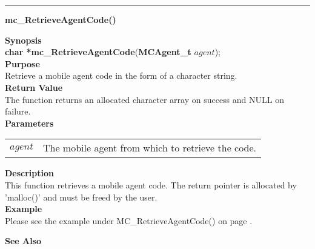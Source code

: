 \noindent
\vspace{5pt}
\rule{6.5in}{0.015in}
\noindent
{\LARGE \bf mc\_RetrieveAgentCode()}\\
{}

\noindent
{\bf Synopsis}\\
{\bf char *mc\_RetrieveAgentCode}({\bf MCAgent\_t} $agent$);\\

\noindent
{\bf Purpose}\\
Retrieve a mobile agent code in the form of a character string.\\

\noindent
{\bf Return Value}\\
The function returns an allocated character array on success and NULL on 
failure.\\

\noindent
{\bf Parameters}
\vspace{-0.1in}
\begin{description}
\item
\begin{tabular}{p{10 mm}p{145 mm}}
$agent$ & The mobile agent from which to retrieve the code.
\end{tabular}
\end{description}

\noindent
{\bf Description}\\
This function retrieves a mobile agent code. 
The return pointer is allocated by 'malloc()' and must be freed by the user.\\

\noindent
{\bf Example}\\
Please see the example under MC\_RetrieveAgentCode() on page
\pageref{api:MC_RetrieveAgentCode()}.\\
\noindent

\noindent
{\bf See Also}

